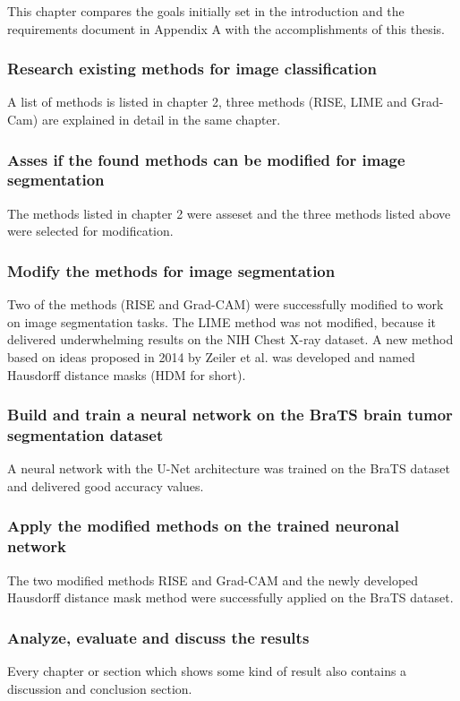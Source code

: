 This chapter compares the goals initially set in the introduction and the requirements document in Appendix A with the accomplishments of this thesis.

\subsubsection{Research existing methods for image classification}
A list of methods is listed in chapter 2, three methods (RISE, LIME and Grad-Cam) are explained in detail in the same chapter.

\subsubsection{Asses if the found methods can be modified for image segmentation}
The methods listed in chapter 2 were asseset and the three methods listed above were selected for modification.

\subsubsection{Modify the methods for image segmentation}
Two of the methods (RISE and Grad-CAM) were successfully modified to work on image segmentation tasks.
The LIME method was not modified, because it delivered underwhelming results on the NIH Chest X-ray dataset.
A new method based on ideas proposed in 2014 by Zeiler et al. was developed and named Hausdorff distance masks (HDM for short).

\subsubsection{Build and train a neural network on the BraTS brain tumor segmentation dataset}
A neural network with the U-Net architecture was trained on the BraTS dataset and delivered good accuracy values.

\subsubsection{Apply the modified methods on the trained neuronal network}
The two modified methods RISE and Grad-CAM and the newly developed Hausdorff distance mask method were successfully applied on the BraTS dataset.

\subsubsection{Analyze, evaluate and discuss the results}
Every chapter or section which shows some kind of result also contains a discussion and conclusion section.


